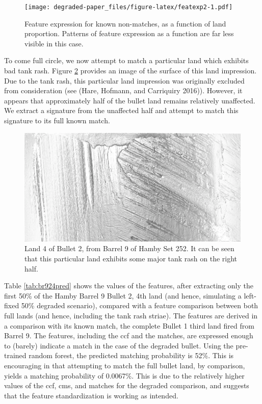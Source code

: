 \documentclass[12pt,]{article}
\theoremstyle{definition}
\theoremstyle{definition}
\theoremstyle{definition}
\theoremstyle{remark}
\begin{document}
\begin{figure}[htbp]
\centering
\texttt{[image: degraded-paper\_files/figure-latex/featexp2-1.pdf]}
\caption{\label{fig:featexp2}Feature expression for known non-matches, as a
function of land proportion. Patterns of feature expression as a
function are far less visible in this case.}
\end{figure}

To come full circle, we now attempt to match a particular land which
exhibits bad tank rash. Figure \ref{fig:br924} provides an image of the
surface of this land impression. Due to the tank rash, this particular
land impression was originally excluded from consideration (see (Hare,
Hofmann, and Carriquiry 2016)). However, it appears that approximately
half of the bullet land remains relatively unaffected. We extract a
signature from the unaffected half and attempt to match this signature
to its full known match.

\begin{figure}[H]
\centering
\includegraphics[width=\linewidth]{images/br9-2-4-greyflip.png}
\caption{Land 4 of Bullet 2, from Barrel 9 of Hamby Set 252. It can be seen that this particular land exhibits some major tank rash on the right half.}
\label{fig:br924}
\end{figure}

Table \ref{tab:br924pred} shows the values of the features, after
extracting only the first 50\% of the Hamby Barrel 9 Bullet 2, 4th land
(and hence, simulating a left-fixed 50\% degraded scenario), compared
with a feature comparison between both full lands (and hence, including
the tank rash striae). The features are derived in a comparison with its
known match, the complete Bullet 1 third land fired from Barrel 9. The
features, including the ccf and the matches, are expressed enough to
(barely) indicate a match in the case of the degraded bullet. Using the
pre-trained random forest, the predicted matching probability is 52\%.
This is encouraging in that attempting to match the full bullet land, by
comparison, yields a matching probability of 0.0067\%. This is due to
the relatively higher values of the ccf, cms, and matches for the
degraded comparison, and suggests that the feature standardization is
working as intended.
\end{document}
